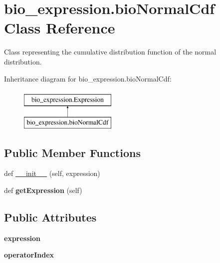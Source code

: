 \hypertarget{classbio__expression_1_1bio_normal_cdf}{}\section{bio\+\_\+expression.\+bio\+Normal\+Cdf Class Reference}
\label{classbio__expression_1_1bio_normal_cdf}


Class representing the cumulative distribution function of the normal distribution.  


Inheritance diagram for bio\+\_\+expression.\+bio\+Normal\+Cdf\+:\begin{figure}[H]
\begin{center}
\leavevmode
\includegraphics[height=2.000000cm]{classbio__expression_1_1bio_normal_cdf}
\end{center}
\end{figure}
\subsection*{Public Member Functions}
\begin{DoxyCompactItemize}
\item 
def \hyperlink{classbio__expression_1_1bio_normal_cdf_aac307b8074c9886391c43d5c733f64a1}{\+\_\+\+\_\+init\+\_\+\+\_\+} (self, expression)
\item 
def {\bfseries get\+Expression} (self)\hypertarget{classbio__expression_1_1bio_normal_cdf_a527e3b80ec29cb8965d2520dc665e206}{}\label{classbio__expression_1_1bio_normal_cdf_a527e3b80ec29cb8965d2520dc665e206}

\end{DoxyCompactItemize}
\subsection*{Public Attributes}
\begin{DoxyCompactItemize}
\item 
{\bfseries expression}\hypertarget{classbio__expression_1_1bio_normal_cdf_a072f5a5a5a9d3d142c8314f89ea0a656}{}\label{classbio__expression_1_1bio_normal_cdf_a072f5a5a5a9d3d142c8314f89ea0a656}

\item 
{\bfseries operator\+Index}\hypertarget{classbio__expression_1_1bio_normal_cdf_aa53261a1e8c2adb0080b545da7e74f0c}{}\label{classbio__expression_1_1bio_normal_cdf_aa53261a1e8c2adb0080b545da7e74f0c}

\end{DoxyCompactItemize}


